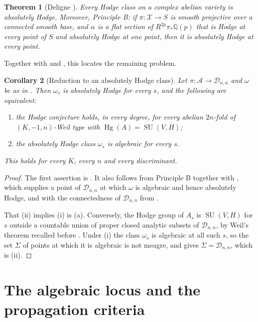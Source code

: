 \documentclass[11pt,reqno]{amsart}
\theoremstyle{plain}
\newtheorem{theorem}{Theorem}[section]
\newtheorem{corollary}[theorem]{Corollary}
\theoremstyle{definition}
\theoremstyle{remark}
\newcommand{\QQ}{\mathbb{Q}}
\newcommand{\cA}{\mathcal{A}}
\newcommand{\cD}{\mathcal{D}}
\newcommand{\cX}{\mathcal{X}}
\DeclareMathOperator{\Hg}{Hg}
\DeclareMathOperator{\SU}{SU}
\begin{document}
\begin{theorem}[Deligne \cite{Del82}]\label{thm:deligneAH}
Every Hodge class on a complex abelian variety is absolutely Hodge. Moreover,
\emph{Principle B}: if $\pi\colon\cX\to S$ is smooth projective over a
connected smooth base, and $\alpha$ is a flat section of $R^{2p}\pi_{*}\QQ(p)$
that is Hodge at every point of $S$ and absolutely Hodge at one point, then it
is absolutely Hodge at every point.
\end{theorem}

Together with  and , this locates
the remaining problem.

\begin{corollary}[Reduction to an absolutely Hodge class]\label{cor:exactform}
Let $\pi\colon\cA\to\cD_{n,n}$ and $\omega$ be as in . Then
$\omega_{s}$ is absolutely Hodge for every $s$, and the following are
equivalent:
\begin{enumerate}[label=\textup{(\roman*)},nosep]
\item the Hodge conjecture holds, in every degree, for every abelian
  $2n$-fold of $(K,-1,n)$-Weil type with $\Hg(A)=\SU(V,H)$;
\item the absolutely Hodge class $\omega_{s}$ is algebraic for every $s$.
\end{enumerate}
This holds for every $K$, every $n$ and every discriminant.
\end{corollary}

\begin{proof}
The first assertion is . It also follows from Principle B
together with , which supplies a point of $\cD_{n,n}$ at
which $\omega$ is algebraic and hence absolutely Hodge, and with the
connectedness of $\cD_{n,n}$ from .

That (ii) implies (i) is (a). Conversely, the Hodge group
of $A_{s}$ is $\SU(V,H)$ for $s$ outside a countable union of proper closed
analytic subsets of $\cD_{n,n}$, by Weil's theorem \cite{Weil77} recalled
before . Under (i) the class $\omega_{s}$ is algebraic at
all such $s$, so the set $\Sigma$ of points at which it is algebraic is not
meagre, and  gives $\Sigma=\cD_{n,n}$, which is (ii).
\end{proof}
\section{The algebraic locus and the propagation criteria}\label{sec:propagation}
\end{document}
